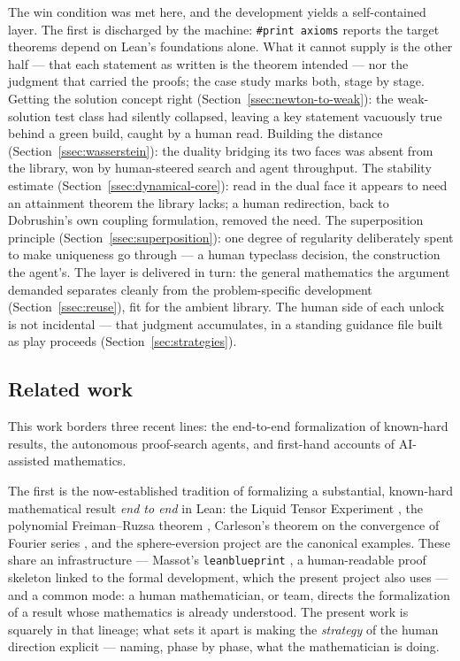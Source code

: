 \documentclass[11pt]{article}
\theoremstyle{plain}
\theoremstyle{definition}
\theoremstyle{remark}
\newcommand{\lean}[1]{\texttt{#1}}
\newcommand{\printaxioms}{\lean{\#print axioms}}
\begin{document}
The win condition was met here, and the development yields a self-contained layer. 
The first is discharged by the machine: \printaxioms{} reports
the target theorems depend on Lean's foundations alone. What it cannot supply is the
other half --- that each statement as written is the theorem intended --- nor the
judgment that carried the proofs; the case study marks both, stage by stage. Getting
the solution concept right (Section~\ref{ssec:newton-to-weak}): the weak-solution
test class had silently collapsed, leaving a key statement vacuously true behind a
green build, caught by a human read. Building the distance
(Section~\ref{ssec:wasserstein}): the duality bridging its two faces was absent from
the library, won by human-steered search and agent throughput. The stability
estimate (Section~\ref{ssec:dynamical-core}): read in the dual face it appears to
need an attainment theorem the library lacks; a human redirection, back to
Dobrushin's own coupling formulation, removed the need. The superposition principle
(Section~\ref{ssec:superposition}): one degree of regularity deliberately spent to
make uniqueness go through --- a human typeclass decision, the construction the
agent's. The layer is delivered in turn: the general mathematics the argument
demanded separates cleanly from the problem-specific development
(Section~\ref{ssec:reuse}), fit for the ambient library. The human side of each
unlock is not incidental --- that judgment accumulates, in a standing guidance file
built as play proceeds (Section~\ref{sec:strategies}).

\subsection{Related work}
This work borders three recent lines: the end-to-end formalization of known-hard
results, the autonomous proof-search agents, and first-hand accounts
of AI-assisted mathematics.

The first is the now-established tradition of formalizing a substantial,
known-hard mathematical result \emph{end to end} in Lean: the Liquid Tensor Experiment
\cite{LTE}, the polynomial Freiman--Ruzsa theorem \cite{PFR}, Carleson's theorem
on the convergence of Fourier series \cite{Carleson}, and the sphere-eversion
project \cite{SphereEversion} are the canonical examples. These share an
infrastructure --- Massot's \lean{leanblueprint} \cite{leanblueprint}, a
human-readable proof skeleton linked to the formal development, which the present
project also uses --- and a common mode: a human mathematician, or team, directs
the formalization of a result whose mathematics is already understood. The present
work is squarely in that lineage; what sets it apart is making the \emph{strategy}
of the human direction explicit --- naming, phase by phase, what the mathematician
is doing.
\end{document}
